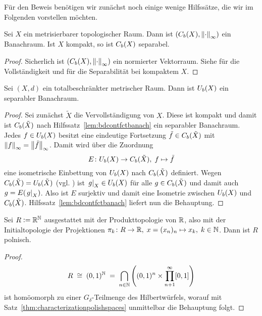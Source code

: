 \documentclass[../main/main.tex]{subfiles}
\begin{document}
	Für den Beweis benötigen wir zunächst noch einige wenige Hilfssätze, die wir im Folgenden vorstellen möchten.
	
	\begin{Hilfssatz}
		\label{lem:bdcontfctbanach}
		Sei $X$ ein metrisierbarer topologischer Raum. Dann ist $(C_b(X), \left\lVert\cdot\right\rVert_\infty)$ ein Banachraum. Ist $X$ kompakt, so ist $C_b(X)$ separabel.
	\end{Hilfssatz}

	\begin{proof}
		Sicherlich ist $(C_b(X), \left\lVert\cdot\right\rVert_\infty)$ ein normierter Vektorraum. Siehe \cite[Satz 2.1.6]{Simon.2015} für die Vollständigkeit und
		\cite[Satz 2.3.7]{Simon.2015} für die Separabilität bei kompaktem $X$.
	\end{proof}
	
	\begin{Hilfssatz}
		\label{lem:bduniffctbanach}
		Sei $(X, d)$ ein totalbeschränkter metrischer Raum. Dann ist $U_b(X)$ ein separabler Banachraum.
	\end{Hilfssatz}
	
	\begin{proof}
		Sei zunächst $\tilde{X}$ die Vervollständigung von $X$. Diese ist kompakt und damit ist $C_b(\tilde{X})$ nach Hilfssatz~\ref{lem:bdcontfctbanach} ein separabler Banachraum.
		Jedes $f \in U_b(X)$ besitzt eine eindeutige Fortsetzung $\tilde{f} \in C_b(\tilde{X})$ mit $\left\lVert f\right\rVert_\infty = \left\lVert\tilde{f}\right\rVert_\infty$. Damit wird über die Zuordnung
		\[ E \colon U_b(X) \to C_b(\tilde{X}), \; f \mapsto \tilde{f}  \]
		eine isometrische Einbettung von $U_b(X)$ nach $C_b(\tilde{X})$ definiert. 
		Wegen $C_b(\tilde{X}) = U_b(\tilde{X})$ (vgl. \cite[Satz 2.3.10]{Simon.2015}) ist $\left.g\right|_{X} \in U_b(X)$ für alle $g \in C_b(\tilde{X})$ und damit
		auch $g = E(\left.g\right|_{X})$. Also ist $E$ surjektiv und damit eine Isometrie zwischen $U_b(X)$ und $C_b(\tilde{X})$. Hilfssatz~\ref{lem:bdcontfctbanach} liefert nun die Behauptung.
	\end{proof}
	
	\begin{Hilfssatz}
		\label{lem:R}
		Sei $R \vcentcolon = \mathbb{R}^{\mathbb{N}}$ ausgestattet mit der Produkttopologie von $\mathbb{R}$, also mit der Initialtopologie der Projektionen $\pi_k \colon R \to \mathbb{R}, \; x = (x_n)_n \mapsto x_k , \; k \in \mathbb{N}$. Dann ist $R$ 
		polnisch.
	\end{Hilfssatz}
	
	\begin{proof}
		\[R \; \cong \; (0, 1)^{\mathbb{N}} \; = \; \bigcap_{n \in \mathbb{N}}  \left( (0, 1)^n \times \prod_{n+1}^{\infty} [0,1] \right) \]
		ist homöomorph zu einer $G_\delta$-Teilmenge des Hilbertwürfels, worauf mit Satz~\ref{thm:characterizationpolishspaces} unmittelbar die Behauptung folgt.
	\end{proof}
\end{document}
